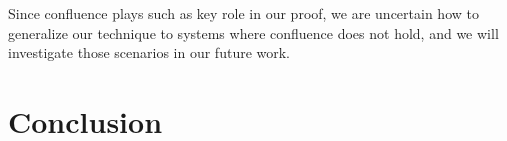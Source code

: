 \documentclass[acmsmall]{acmart}
\newcommand{\lang}{$\lambda^H$\xspace}
\begin{document}
Since confluence plays such as key role in our proof, we are uncertain
how to generalize our technique to systems where confluence does not
hold, and we will investigate those scenarios in our future work.





\section{Conclusion}
\label{sec:conclusion}









\end{document}
